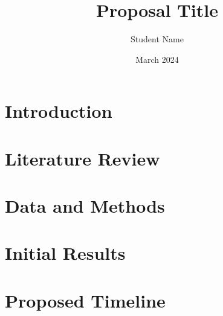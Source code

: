 \documentclass{article}
\title{Proposal Title}
\author{Student Name}
\date{March 2024}
\begin{document}
\maketitle

\section{Introduction}

\section{Literature Review}
\section{Data and Methods}
\section{Initial Results}
\section{Proposed Timeline}

\cite{abend_meaning_2008}
\end{document}
